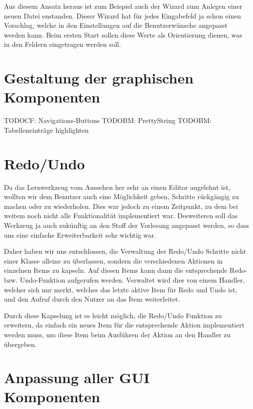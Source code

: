 Aus diesem Ansatz heraus ist zum Beispiel auch der Wizard zum Anlegen einer
neuen Datei enstanden. Dieser Wizard hat für jedes Eingabefeld ja schon einen
Vorschlag, welche in den Einstellungen auf die Benutzerwünsche angepasst werden
kann. Beim ersten Start sollen diese Werte als Orientierung dienen, was in den
Feldern eingetragen werden soll.
\vspace{10pt}


\section{Gestaltung der graphischen Komponenten}\label{GUIDesign}

TODOCF: Navigations-Buttons
TODOBM: PrettyString
TODOBM: Tabelleneinträge highlighten



\section{Redo/Undo}\label{GUIRedoUndo}

Da das Lernwerkzeug vom Aussehen her sehr an einen Editor angelehnt ist,
wollten wir dem Benutzer auch eine Möglichkeit geben, Schritte rückgängig zu
machen oder zu wiederholen. Dies war jedoch zu einem Zeitpunkt, zu dem bei
weitem noch nicht alle Funktionalität implementiert war. Desweiteren soll das
Werkzeug ja auch zukünftig an den Stoff der Vorlesung angepasst werden, so dass
uns eine einfache Erweiterbarkeit sehr wichtig war.\vspace{10pt}

Daher haben wir uns entschlossen, die Verwaltung der Redo/Undo Schritte nicht
einer Klasse alleine zu überlassen, sondern die verschiedenen Aktionen in
einzelnen Items zu kapseln. Auf diesen Items kann dann die entsprechende Redo-
bzw. Undo-Funktion aufgerufen werden. Verwaltet wird dies von einem Handler,
welcher sich nur merkt, welches das letzte aktive Item für Redo und Undo ist,
und den Aufruf durch den Nutzer an das Item weiterleitet.\vspace{10pt}

Durch diese Kapselung ist es leicht möglich, die Redo/Undo Funktion zu
erweitern, da einfach ein neues Item für die entsprechende Aktion implementiert
werden muss, um diese Item beim Ausführen der Aktion an den Handler zu
übergeben.\vspace{10pt}


\section{Anpassung aller GUI Komponenten}\label{GUIAdaption}

